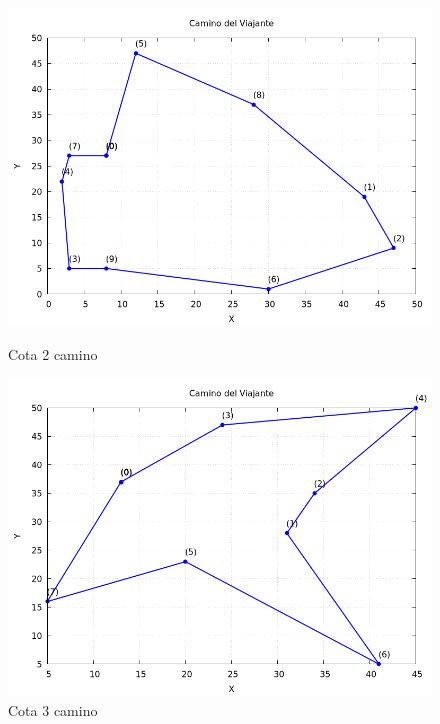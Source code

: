 \documentclass[11pt,openany]{book}
\begin{document}
\begin{figure}[H]
    \begin{minipage}{.48\textwidth}
          \centering
          \includegraphics[width=1\linewidth]{assets/Img/cota2camino.png}
          \caption{Cota 2 camino}
          \label{fig:Cota 2 camino}
    \end{minipage}
\begin{minipage}{.48\textwidth}
      \centering
      \includegraphics[width=1\linewidth]{assets/Img/cota3camino.png}
      \caption{Cota 3 camino}
      \label{fig:Cota 3 camino}
\end{minipage}
\end{figure}
\end{document}
